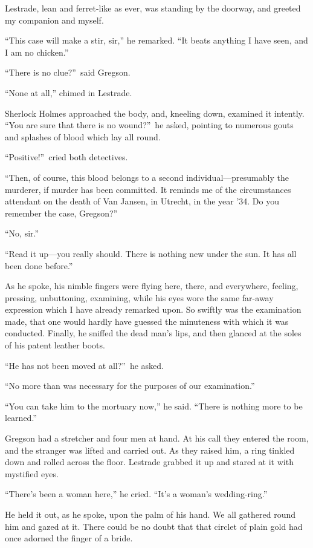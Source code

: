 \documentclass[12pt,english,oneside]{book}
\newcommand{\mdsh}[1]{\mbox{#1}\linebreak[1]}
\begin{document}
Lestrade, lean and ferret-like as ever, was standing by the doorway,
and greeted my companion and myself.

{}``This case will make a stir, sir,'' he remarked. {}``It beats
anything I have seen, and I am no chicken.''

{}``There is no clue?''\ said Gregson.

{}``None at all,'' chimed in Lestrade.

Sherlock Holmes approached the body, and, kneeling down, examined
it intently. {}``You are sure that there is no wound?''\ he asked,
pointing to numerous gouts and splashes of blood which lay all round.

{}``Positive!''\ cried both detectives.

{}``Then, of course, this blood belongs to a second individual\mdsh{---}presumably
the murderer, if murder has been committed. It reminds me of the circumstances
attendant on the death of Van Jansen, in Utrecht, in the year '34.
Do you remember the case, Gregson?''

{}``No, sir.''

{}``Read it up\mdsh{---}you really should. There is nothing new
under the sun. It has all been done before.''

As he spoke, his nimble fingers were flying here, there, and everywhere,
feeling, pressing, unbuttoning, examining, while his eyes wore the
same far-away expression which I have already remarked upon. So swiftly
was the examination made, that one would hardly have guessed the minuteness
with which it was conducted. Finally, he sniffed the dead man's lips,
and then glanced at the soles of his patent leather boots.

{}``He has not been moved at all?''\ he asked.

{}``No more than was necessary for the purposes of our examination.''

{}``You can take him to the mortuary now,'' he said. {}``There
is nothing more to be learned.''

Gregson had a stretcher and four men at hand. At his call they entered
the room, and the stranger was lifted and carried out. As they raised
him, a ring tinkled down and rolled across the floor. Lestrade grabbed
it up and stared at it with mystified eyes.

{}``There's been a woman here,'' he cried. {}``It's a woman's wedding-ring.''

He held it out, as he spoke, upon the palm of his hand. We all gathered
round him and gazed at it. There could be no doubt that that circlet
of plain gold had once adorned the finger of a bride.
\end{document}
